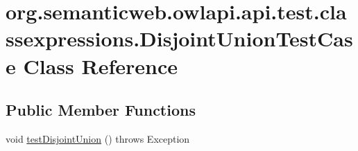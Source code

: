 \hypertarget{classorg_1_1semanticweb_1_1owlapi_1_1api_1_1test_1_1classexpressions_1_1_disjoint_union_test_case}{\section{org.\-semanticweb.\-owlapi.\-api.\-test.\-classexpressions.\-Disjoint\-Union\-Test\-Case Class Reference}
\label{classorg_1_1semanticweb_1_1owlapi_1_1api_1_1test_1_1classexpressions_1_1_disjoint_union_test_case}
}
\subsection*{Public Member Functions}
\begin{DoxyCompactItemize}
\item 
void \hyperlink{classorg_1_1semanticweb_1_1owlapi_1_1api_1_1test_1_1classexpressions_1_1_disjoint_union_test_case_a5bc3cfdf4eaa10e1744039f4192b7910}{test\-Disjoint\-Union} ()  throws Exception 
\end{DoxyCompactItemize}
